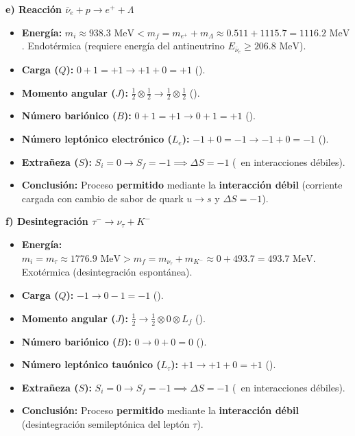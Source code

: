 \begin{problema}
\textbf{e) Reacción $\bar{\nu}_e + p \to e^+ + \Lambda$}
\begin{itemize}
    \item \textbf{Energía:} $m_i \approx 938.3 \text{ MeV} < m_f = m_{e^+} + m_\Lambda \approx 0.511 + 1115.7 = 1116.2 \text{ MeV}$. Endotérmica (requiere energía del antineutrino $E_{\bar{\nu}_e} \ge 206.8 \text{ MeV}$).
    \item \textbf{Carga ($Q$):} $0 + 1 = +1 \to +1 + 0 = +1$ (\checkmark).
    \item \textbf{Momento angular ($J$):} $\frac{1}{2} \otimes \frac{1}{2} \to \frac{1}{2} \otimes \frac{1}{2}$ (\checkmark).
    \item \textbf{Número bariónico ($B$):} $0 + 1 = +1 \to 0 + 1 = +1$ (\checkmark).
    \item \textbf{Número leptónico electrónico ($L_e$):} $-1 + 0 = -1 \to -1 + 0 = -1$ (\checkmark).
    \item \textbf{Extrañeza ($S$):} $S_i = 0 \to S_f = -1 \implies \Delta S = -1$ (\checkmark\, en interacciones débiles).
    \item \textbf{Conclusión:} Proceso \textbf{permitido} mediante la \textbf{interacción débil} (corriente cargada con cambio de sabor de quark $u \to s$ y $\Delta S = -1$).
\end{itemize}

\textbf{f) Desintegración $\tau^- \to \nu_\tau + K^-$}
\begin{itemize}
    \item \textbf{Energía:} $m_i = m_\tau \approx 1776.9 \text{ MeV} > m_f = m_{\nu_\tau} + m_{K^-} \approx 0 + 493.7 = 493.7 \text{ MeV}$. Exotérmica (desintegración espontánea).
    \item \textbf{Carga ($Q$):} $-1 \to 0 - 1 = -1$ (\checkmark).
    \item \textbf{Momento angular ($J$):} $\frac{1}{2} \to \frac{1}{2} \otimes 0 \otimes L_f$ (\checkmark).
    \item \textbf{Número bariónico ($B$):} $0 \to 0 + 0 = 0$ (\checkmark).
    \item \textbf{Número leptónico tauónico ($L_\tau$):} $+1 \to +1 + 0 = +1$ (\checkmark).
    \item \textbf{Extrañeza ($S$):} $S_i = 0 \to S_f = -1 \implies \Delta S = -1$ (\checkmark\, en interacciones débiles).
    \item \textbf{Conclusión:} Proceso \textbf{permitido} mediante la \textbf{interacción débil} (desintegración semileptónica del leptón $\tau$).
\end{itemize}


\end{problema}
